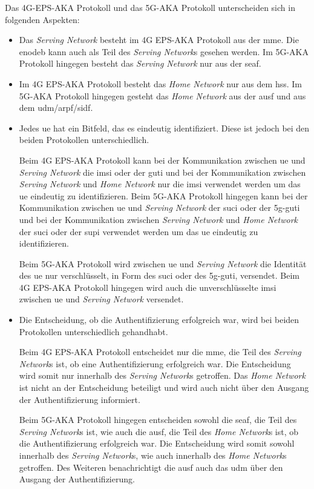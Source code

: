 Das 4G-EPS-AKA Protokoll und das 5G-AKA Protokoll unterscheiden sich in folgenden Aspekten: %

\begin{itemize}
\item Das \textit{Serving Network} besteht im 4G EPS-AKA Protokoll aus der \gls{mme}. 
Die \gls{enodeb} kann auch als Teil des \textit{Serving Network}s gesehen werden.
Im 5G-AKA Protokoll hingegen besteht das \textit{Serving Network} nur aus der \gls{seaf}.

\item Im 4G EPS-AKA Protokoll besteht das \textit{Home Network} nur aus dem \gls{hss}.
Im 5G-AKA Protokoll hingegen gesteht das \textit{Home Network} aus der \gls{ausf} und aus dem \gls{udm}/\gls{arpf}/\gls{sidf}.

\item Jedes \gls{ue} hat ein Bitfeld, das es eindeutig identifiziert.
Diese ist jedoch bei den beiden Protokollen unterschiedlich.

Beim 4G EPS-AKA Protokoll kann bei der Kommunikation zwischen \gls{ue} und \textit{Serving Network} die \gls{imsi} oder der \gls{guti} und bei der Kommunikation zwischen \textit{Serving Network} und \textit{Home Network} nur die \gls{imsi} verwendet werden um das \gls{ue} eindeutig zu identifizieren.
Beim 5G-AKA Protokoll hingegen kann bei der Kommunikation zwischen \gls{ue} und \textit{Serving Network} der \gls{suci} oder der \gls{5g-guti} und bei der Kommunikation zwischen \textit{Serving Network} und \textit{Home Network} der \gls{suci} oder der \gls{supi} verwendet werden um das \gls{ue} eindeutig zu identifizieren.

Beim 5G-AKA Protokoll wird zwischen \gls{ue} und \textit{Serving Network} die Identität des \gls{ue} nur verschlüsselt, in Form des \gls{suci} oder des \gls{5g-guti}, versendet. Beim 4G EPS-AKA Protokoll hingegen wird auch die unverschlüsselte \gls{imsi} zwischen \gls{ue} und \textit{Serving Network} versendet.

\item Die Entscheidung, ob die Authentifizierung erfolgreich war, wird bei beiden Protokollen unterschiedlich gehandhabt.

Beim 4G EPS-AKA Protokoll entscheidet nur die \gls{mme}, die Teil des \textit{Serving Network}s ist, ob eine Authentifizierung erfolgreich war.
Die Entscheidung wird somit nur innerhalb des \textit{Serving Network}s getroffen.
Das \textit{Home Network} ist nicht an der Entscheidung beteiligt und wird auch nicht über den Ausgang der Authentifizierung informiert.

Beim 5G-AKA Protokoll hingegen entscheiden sowohl die \gls{seaf}, die Teil des \textit{Serving Network}s ist, wie auch die \gls{ausf}, die Teil des \textit{Home Network}s ist, ob die Authentifizierung erfolgreich war.
Die Entscheidung wird somit sowohl innerhalb des \textit{Serving Network}s, wie auch innerhalb des \textit{Home Network}s getroffen.
Des Weiteren benachrichtigt die \gls{ausf} auch das \gls{udm} über den Ausgang der Authentifizierung.
\end{itemize}